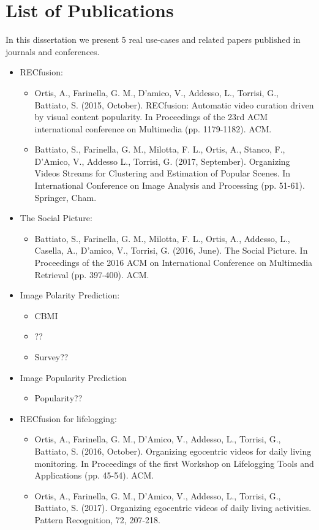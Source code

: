 \section{List of Publications}
In this dissertation we present 5 real use-cases and related papers published in journals and conferences.
\begin{itemize}
	\item 	RECfusion:
	\begin{itemize}
		\item Ortis, A., Farinella, G. M., D'amico, V., Addesso, L., Torrisi, G., Battiato, S. (2015, October). RECfusion: Automatic video curation driven by visual content popularity. In Proceedings of the 23rd ACM international conference on Multimedia (pp. 1179-1182). ACM.
		\item Battiato, S., Farinella, G. M., Milotta, F. L., Ortis, A., Stanco, F., D’Amico, V., Addesso L., Torrisi, G. (2017, September). Organizing Videos Streams for Clustering and Estimation of Popular Scenes. In International Conference on Image Analysis and Processing (pp. 51-61). Springer, Cham.		
	\end{itemize}
	
	\item The Social Picture:
	\begin{itemize}
		\item Battiato, S., Farinella, G. M., Milotta, F. L., Ortis, A., Addesso, L., Casella, A.,  D'amico, V., Torrisi, G. (2016, June). The Social Picture. In Proceedings of the 2016 ACM on International Conference on Multimedia Retrieval (pp. 397-400). ACM.	
	\end{itemize}
	
	\item Image Polarity Prediction:
	\begin{itemize}
		\item CBMI
		\item ??
		\item Survey??
	\end{itemize}
	
	\item Image Popularity Prediction
	\begin{itemize}
		\item Popularity??
	\end{itemize}
	
	\item RECfusion for lifelogging:
	\begin{itemize}
		\item Ortis, A., Farinella, G. M., D'Amico, V., Addesso, L., Torrisi, G.,  Battiato, S. (2016, October). Organizing egocentric videos for daily living monitoring. In Proceedings of the first Workshop on Lifelogging Tools and Applications (pp. 45-54). ACM.
		\item Ortis, A., Farinella, G. M., D’Amico, V., Addesso, L., Torrisi, G., Battiato, S. (2017). Organizing egocentric videos of daily living activities. Pattern Recognition, 72, 207-218.
	\end{itemize}
	
\end{itemize}
